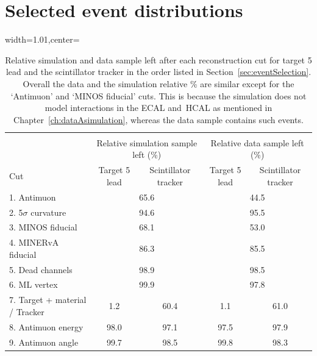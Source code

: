 \chapter{Selected event distributions}

\label{ch:appendix_eventSelection}
\vspace{-25pt}
\begin{table}[h]
    \centering
    \begin{adjustbox}{width=1.01\textwidth,center=\textwidth}
    \begin{tabular}{l c c c c}
    \hline \\ [-1.5 ex]
    & \multicolumn{2}{c}{Relative simulation sample left (\%) }  & \multicolumn{2}{c}{Relative data sample left (\%)}  \\ [0.5ex] %
    Cut & Target 5 lead & Scintillator tracker & Target 5 lead & Scintillator tracker \\ [0.5ex]
    \hline
    \hline
    1. Antimuon & \multicolumn{2}{c}{65.6} & \multicolumn{2}{c}{44.5}  \\
    2. 5$\sigma$ curvature & \multicolumn{2}{c}{94.6} & \multicolumn{2}{c}{95.5} \\
    3. MINOS fiducial & \multicolumn{2}{c}{68.1} & \multicolumn{2}{c}{53.0} \\
    4. MINERvA fiducial & \multicolumn{2}{c}{86.3} & \multicolumn{2}{c}{85.5}  \\
    5. Dead channels &  \multicolumn{2}{c}{98.9} & \multicolumn{2}{c}{98.5}\\
    6. ML vertex  & \multicolumn{2}{c}{99.9} & \multicolumn{2}{c}{97.8} \\
    7. Target + material / Tracker & 1.2 & 60.4 & 1.1 & 61.0  \\
    8. Antimuon energy & 98.0 & 97.1 & 97.5 & 97.9 \\
    9. Antimuon angle & 99.7 & 98.5 & 99.8 & 98.3 \\
    \hline
    \end{tabular}
    \end{adjustbox}
    \caption{Relative simulation and data sample left after each reconstruction cut for target 5 lead and the scintillator tracker in the order listed in Section~\ref{sec:eventSelection}. Overall the data and the simulation relative \% are similar except for the `Antimuon' and `MINOS fiducial' cuts. This is because the simulation does not model interactions in the ECAL and~HCAL as mentioned in Chapter~\ref{ch:dataAsimulation}, whereas the data sample contains such events. }
    \label{table:relativeSampleLeft}
\end{table}
\vspace{-26pt}

